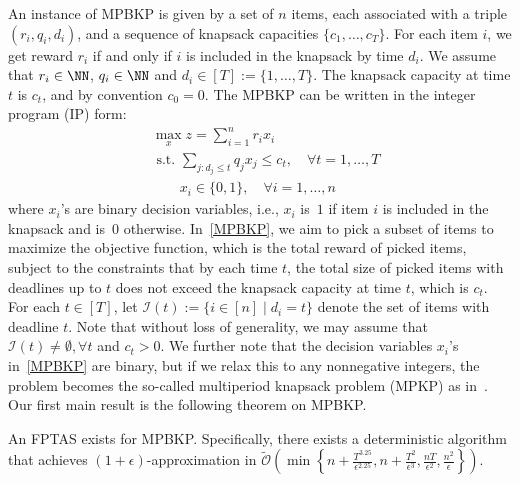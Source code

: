 \documentclass[11pt]{article}
\begin{document}
An instance of MPBKP is given by a set of $n$ items, each associated with a triple $(r_i,q_i,d_i)$, and a sequence of knapsack capacities $\{c_1,\ldots,c_T\}$. For each item $i$, we get reward $r_i$ if and only if $i$ is included in the knapsack by time $d_i$. We assume that $r_i\in \NN$, $q_i\in\NN$ and $d_i\in [T]:=\{1,\ldots, T\}$. The knapsack capacity at time $t$ is $c_t$, and by convention $c_0=0$. The MPBKP can be written in the integer program (IP) form:
\begin{subequations}\label{MPBKP}
	\begin{align}
	&\max_x z = \sum_{i=1}^{n} r_ix_i\\
	&\text{ s.t. } \sum_{j: d_j\le t} q_jx_j\le c_{t},\quad \forall t=1,\ldots, T\\
	&\qquad x_i\in\{0,1\},\quad \forall i=1,\ldots,n
	\end{align}
\end{subequations}
where $x_i$'s are binary decision variables, i.e., $x_i$ is~$1$ if item $i$ is included in the knapsack and is~$0$ otherwise. In~\eqref{MPBKP}, we aim to pick a subset of items to maximize the objective function, which is the total reward of picked items, subject to the constraints that by each time $t$, the total size of picked items with deadlines up to $t$ does not exceed the knapsack capacity at time $t$, which is $c_{t}$. 
For each $t\in [T]$, let $\mathcal{I}(t):=\{i\in [n]\mid d_i=t\}$ denote the set of items with deadline $t$. Note that without loss of generality, we may assume that $\mathcal{I}(t)\ne\emptyset, \forall t$ and $c_t>0$.
We further note that the decision variables $x_i$'s in~\eqref{MPBKP} are binary, but if we relax this to any nonnegative integers, the problem becomes the so-called multiperiod knapsack problem (MPKP) as in~\cite{faaland1981multiperiod}. %
Our first main result is the following theorem on MPBKP.
\begin{theorem}\label{mainthm1}
	An FPTAS exists for MPBKP. Specifically, there exists a deterministic algorithm that achieves $(1+\epsilon)$-approximation in $\tilde{\mathcal{O}}\left(\min\left\{n+\frac{T^{3.25}}{\epsilon^{2.25}},n+\frac{T^{2}}{\epsilon^{3}},\frac{nT}{\epsilon^2},\frac{n^2}{\epsilon}\right\}\right)$.
\end{theorem}
\end{document}
